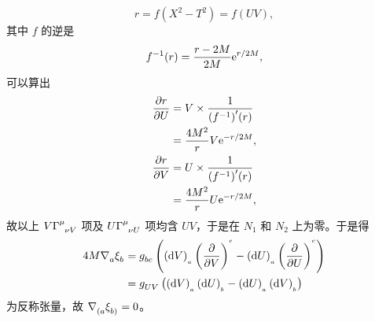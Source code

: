 \begin{xiti}
\begin{zm}
\begin{enumerate}
			\begin{equation*}
				r = f(X^2 - T^2) = f(UV),
			\end{equation*}
			其中 $f$ 的逆是
			\begin{equation*}
				f^{-1}(r) = \frac{r-2M}{2M} \mathrm{e}^{r/2M},
			\end{equation*}
			可以算出
			\begin{align*}
				\pdv{r}{U} &= V \times \frac{1}{{\left(f^{-1}\right)}'(r)}\\
				&= \frac{4M^2}{r} V \mathrm{e}^{-r/2M},\\
				\pdv{r}{V} &= U \times \frac{1}{{\left( f^{-1} \right)}'(r)}\\
				&= \frac{4M^2}{r} U \mathrm{e}^{-r/2M},
			\end{align*}
			故以上 $V \ChristoffelSymbol{\mu}{\nu}{V}$ 项及 $U \ChristoffelSymbol{\mu}{\nu}{U}$ 项均含 $UV$，于是在 $N_1$ 和 $N_2$ 上为零。于是得
			\begin{align*}
				4M \Nabla{a} \tensor{\xi}{_b} &= \tensor{g}{_b_c} \left( \tensord{V}{_a} \tensorp{V}{^c} - \tensord{U}{_a} \tensorp{U}{^c} \right)\\
				&= \tensor{g}{_U_V} \left( \tensord{V}{_a} \tensord{U}{_b} - \tensord{U}{_a} \tensord{V}{_b} \right)
			\end{align*}
			为反称张量，故 $\Nabla{(a} \tensor{\xi}{_{b)}} = 0$。
		\end{enumerate}
	\end{zm}


\end{xiti}
